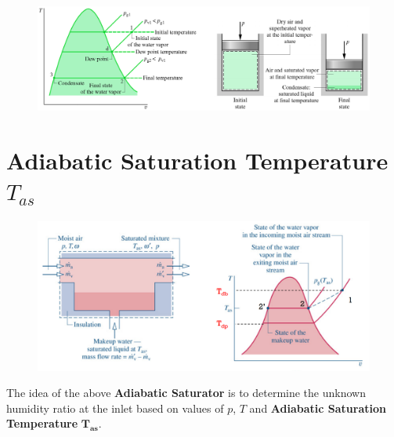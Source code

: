 \documentclass[class=report, crop=false, 12pt,a4paper]{standalone}
\numberwithin{equation}{section}
\begin{document}
\begin{figure}[H]
  \centering
  \includegraphics[width = 1 \textwidth]{../img/diagram101.png}
  \caption{}
\end{figure}
\section{Adiabatic Saturation Temperature $T_{as}$}
\begin{figure}[H]
  \centering
  \includegraphics[width = 1 \textwidth]{../img/diagram102.png}
  \caption{}
\end{figure}
The idea of the above \textbf{Adiabatic Saturator} is to determine the unknown humidity ratio at the inlet based on values of $p$, $T$ and \textbf{Adiabatic Saturation Temperature} $\mathbf{T_{as}}$.
\end{document}
